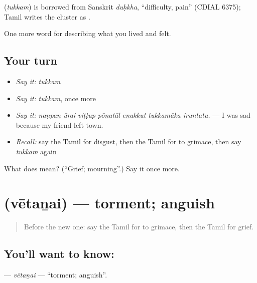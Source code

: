 \begin{cousinweb}
\textbf{} (\emph{tukkam}) is borrowed from Sanskrit \emph{duḥkha}, \textquotedblleft{}difficulty, pain\textquotedblright{} (CDIAL 6375); Tamil writes the cluster as .
\end{cousinweb}

\begin{grammarlens}[title={What you've built}]
One more word for describing what you lived and felt.
\end{grammarlens}

\subsection*{Your turn}
\begin{itemize}
\raggedright
  \item \emph{Say it:} \emph{tukkam}
  \item \emph{Say it:} \emph{tukkam}, once more
  \item \emph{Say it:} \emph{naṇpaṉ ūrai viṭṭup pōṉatāl eṉakkut tukkamāka iruntatu.} — I was sad because my friend left town.
  \item \emph{Recall:} say the Tamil for disgust, then the Tamil for to grimace, then say \emph{tukkam} again
\end{itemize}

\begin{tcolorbox}[breakable,colback=teal!4,colframe=teal!35!black,title={Before you move on}]
What does  mean? (\textquotedblleft{}Grief; mourning\textquotedblright{}.) Say it once more.
\end{tcolorbox}
\section[\texorpdfstring{\ta{வேதனை} (vētaṉai)}{வேதனை (vētaṉai)}]{ (vētaṉai) — torment; anguish}

\label{lesson:TA-C463-vetanai}



\begin{quote}
Before the new one: say the Tamil for to grimace, then the Tamil for grief.
\end{quote}

\subsection*{You'll want to know: }
\textbf{} — \emph{vētaṉai} — \textquotedblleft{}torment; anguish\textquotedblright{}.

